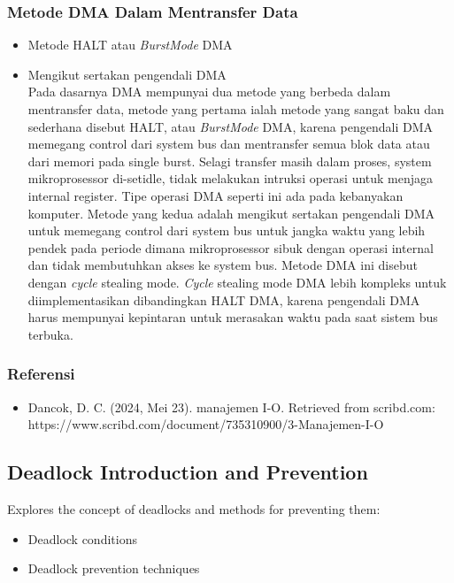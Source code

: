 \documentclass[12pt]{article}
\begin{document}
\subsubsection{Metode DMA Dalam Mentransfer Data}
\begin{itemize}
    \item Metode HALT atau \textit{BurstMode} DMA
    \item Mengikut sertakan pengendali DMA \\
    Pada dasarnya DMA mempunyai dua metode yang berbeda dalam mentransfer data, metode yang pertama ialah metode yang sangat baku dan sederhana disebut HALT, atau \textit{BurstMode} DMA, karena pengendali DMA memegang control dari system bus dan mentransfer semua blok data atau dari memori pada single burst. Selagi transfer masih dalam proses, system mikroprosessor di-setidle, tidak melakukan intruksi operasi untuk menjaga internal register. Tipe operasi DMA seperti ini ada pada kebanyakan komputer. Metode yang kedua adalah mengikut sertakan pengendali DMA untuk memegang control dari system bus untuk jangka waktu yang lebih pendek pada periode dimana mikroprosessor sibuk dengan operasi internal dan tidak membutuhkan akses ke system bus. Metode DMA ini disebut dengan \textit{cycle} stealing mode. \textit{Cycle} stealing mode DMA lebih kompleks untuk diimplementasikan dibandingkan HALT DMA, karena pengendali DMA harus mempunyai kepintaran untuk merasakan waktu pada saat sistem bus terbuka.
\end{itemize}

\subsubsection{Referensi}
\begin{itemize}
    \item Dancok, D. C. (2024, Mei 23). manajemen I-O. Retrieved from scribd.com: https://www.scribd.com/document/735310900/3-Manajemen-I-O 
\end{itemize}

\subsection{Deadlock Introduction and Prevention}
Explores the concept of deadlocks and methods for preventing them:
\begin{itemize}
    \item Deadlock conditions
    \item Deadlock prevention techniques
\end{itemize}
\end{document}
